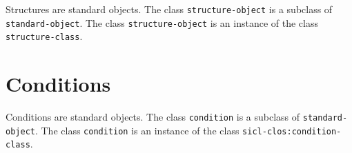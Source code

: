 Structures are standard objects.  The class \texttt{structure-object}
is a subclass of \texttt{standard-object}.  The class
\texttt{structure-object} is an instance of the class
\texttt{structure-class}.

\section{Conditions}

Conditions are standard objects.  The class \texttt{condition} is a
subclass of \texttt{standard-object}.  The class \texttt{condition} is
an instance of the class \texttt{sicl-clos:condition-class}.

